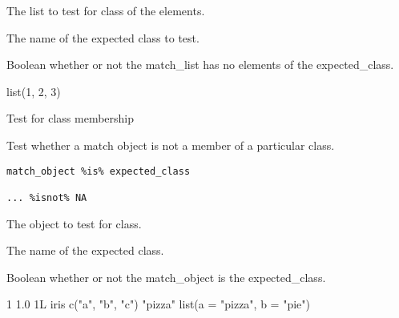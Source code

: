 \documentclass[a4paper]{book}
\begin{document}
%
\begin{Arguments}
\begin{ldescription}
\item[\code{match\_list.}] The list to test for class of the elements.

\item[\code{expected\_class.}] The name of the expected class to test.
\end{ldescription}
\end{Arguments}
%
\begin{Value}
Boolean whether or not the match\_list has no elements of the expected\_class.
\end{Value}
%
\begin{Examples}
\begin{ExampleCode}
  list(1, 2, 3) %
\end{ExampleCode}
\end{Examples}
%
\begin{Description}\relax
Test for class membership

Test whether a match object is not a member of a particular class.
\end{Description}
%
\begin{Usage}
\begin{verbatim}
match_object %is% expected_class

... %isnot% NA
\end{verbatim}
\end{Usage}
%
\begin{Arguments}
\begin{ldescription}
\item[\code{match\_object.}] The object to test for class.

\item[\code{expected\_class.}] The name of the expected class.
\end{ldescription}
\end{Arguments}
%
\begin{Value}
Boolean whether or not the match\_object is the expected\_class.
\end{Value}
%
\begin{Examples}
\begin{ExampleCode}
  1 %
  1.0 %
  1L %
  iris %
  c("a", "b", "c") %
  "pizza" %
  list(a = "pizza", b = "pie") %
\end{ExampleCode}
\end{Examples}
\printindex{}
\end{document}
